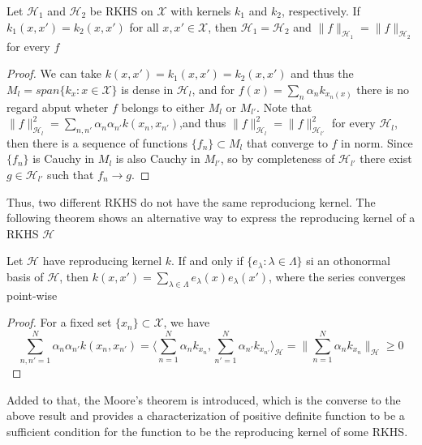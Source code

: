 \begin{propo}
Let $\mathscr{H}_1$ and $\mathscr{H}_2$ be RKHS on $\mathscr{X}$ with kernels $k_1$ and $k_2$, respectively. If $k_1(x,x')=k_2(x,x')$ for all $x,x' \in \mathscr{X}$, then $\mathscr{H}_1=\mathscr{H}_2$ and $\|f\|_{\mathscr{H}_1}=\|f\|_{\mathscr{H}_2}$ for every $f$
\end{propo}

\begin{proof}
We can take $k(x,x')=k_1(x,x')=k_2(x,x')$ and thus the $M_l=span\{k_x: x\in \mathscr{X} \}$ is dense in $\mathscr{H}_l$, and for $f(x)=\sum_n \alpha_n k_{x_n(x)}$ there is no regard abput wheter $f$ belongs to either $M_l$ or $M_{l'}$. Note that $\|f\|^2_{\mathscr{H}_{l}} = \sum_{n,n'}\alpha_n\alpha_{n'}k(x_n,x_{n'})$,and thus $\|f\|^2_{\mathscr{H}_l}=\|f\|^2_{\mathscr{H}_{l'}}$ for every $\mathscr{H}_l$, then there is a sequence of functions $\{f_n\} \subset M_l$ that converge to $f$ in norm. Since $\{f_n\}$ is Cauchy in $M_l$ is also Cauchy in $M_{l'}$, so by completeness of $\mathscr{H}_{l'}$ there exist $g \in \mathscr{H}_{l'}$ such that $f_n \rightarrow g$.
\end{proof}

Thus, two different RKHS do not have the same reproduciong kernel. The following theorem shows an alternative way to express the reproducing kernel of a RKHS $\mathscr{H}$

\begin{theorem}
Let $\mathscr{H}$ have reproducing kernel $k$. If and only if $\{e_\lambda: \lambda \in \Lambda \}$ si an othonormal basis of $\mathscr{H}$, then $k(x,x')=\sum_{\lambda \in \Lambda}e_\lambda(x)e_\lambda(x')$, where the series converges point-wise
\end{theorem}

\begin{proof}
 For a fixed set $\{x_n\} \subset \mathscr{X}$, we have
 \begin{equation}
     \sum_{n,n'=1}^{N}\alpha_n\alpha_{n'}k(x_n,x_{n'}) = \langle \sum_{n=1}^{N}\alpha_n k_{x_n},\sum_{n'=1}^{N}\alpha_{n'}k_{x_{n'}} \rangle_{\mathscr{H}}=\|\sum_{n=1}^N\alpha_n k_{x_{n}}\|_{\mathscr{H}} \geq 0
 \end{equation}
\end{proof}

Added to that, the Moore's theorem is introduced, which is the converse to the above result and provides a characterization of positive definite function to be a sufficient condition for the function to be the reproducing kernel of some RKHS.

